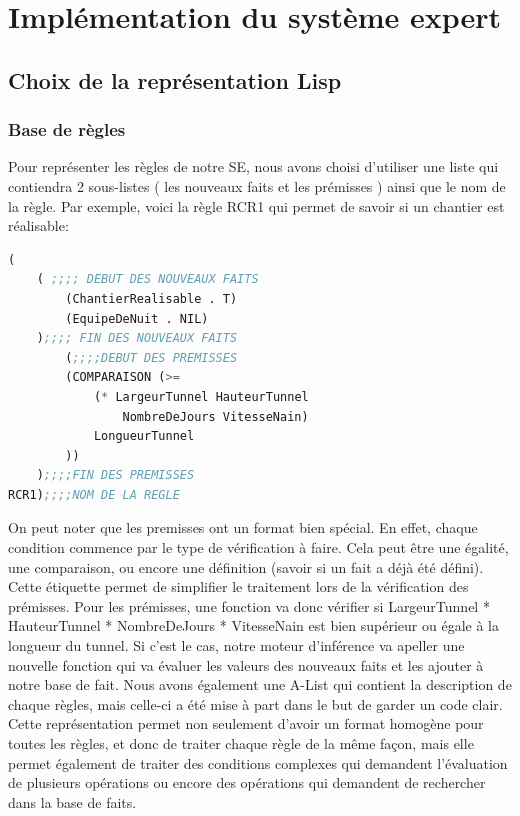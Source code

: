 \documentclass[a4paper,10pt]{report}
\begin{document}
\chapter{Implémentation du système expert}
  \section{Choix de la représentation Lisp}
    \subsection{Base de règles}
    Pour représenter les règles de notre SE, nous avons choisi d'utiliser une liste qui contiendra 2 sous-listes ( les nouveaux faits et les prémisses )
    ainsi que le nom de la règle. Par exemple, voici la règle RCR1 qui permet de savoir si un chantier est réalisable:\newline
    \begin{lstlisting}[language=Lisp]
(
	( ;;;; DEBUT DES NOUVEAUX FAITS
		(ChantierRealisable . T)
		(EquipeDeNuit . NIL)
	);;;; FIN DES NOUVEAUX FAITS
		(;;;;DEBUT DES PREMISSES
		(COMPARAISON (>=
			(* LargeurTunnel HauteurTunnel
			    NombreDeJours VitesseNain)
			LongueurTunnel
		))
	);;;;FIN DES PREMISSES
RCR1);;;;NOM DE LA REGLE

    \end{lstlisting}

    On peut noter que les premisses ont un format bien spécial. En effet, chaque condition commence par le type de vérification à faire. Cela peut être une égalité,
    une comparaison, ou encore une définition (savoir si un fait a déjà été défini). Cette étiquette permet de simplifier le traitement lors de la vérification
    des prémisses. Pour les prémisses, une fonction va donc vérifier si LargeurTunnel * HauteurTunnel * NombreDeJours * VitesseNain est bien supérieur ou égale à la
    longueur du tunnel. Si c'est le cas, notre moteur d'inférence va apeller une nouvelle fonction qui va évaluer les valeurs des nouveaux faits et les ajouter à
    notre base de fait. Nous avons également une A-List qui contient la description de chaque règles, mais celle-ci a été mise à part dans le but de garder un code
    clair. Cette représentation permet non seulement d'avoir un format homogène pour toutes les règles, et donc de traiter chaque règle de la même façon, mais elle
    permet également de traiter des conditions complexes qui demandent l'évaluation de plusieurs opérations ou encore des opérations qui demandent de rechercher
    dans la base de faits.
\end{document}
